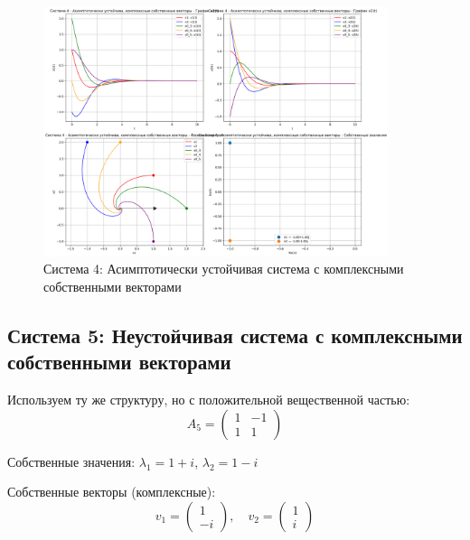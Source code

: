 \begin{figure}[h!]
\centering
\includegraphics[width=0.9\textwidth]{images/task1/система_4_-_асимптотически_устойчива,_комплексные_собственные_векторы.png}
\caption{Система 4: Асимптотически устойчивая система с комплексными собственными векторами}
\label{fig:system4}
\end{figure}

\subsection{Система 5: Неустойчивая система с комплексными собственными векторами}

Используем ту же структуру, но с положительной вещественной частью:
\begin{equation}
A_5 = \begin{pmatrix} 1 & -1 \\ 1 & 1 \end{pmatrix}
\end{equation}

Собственные значения: $\lambda_1 = 1 + i$, $\lambda_2 = 1 - i$

Собственные векторы (комплексные):
\begin{equation}
v_1 = \begin{pmatrix} 1 \\ -i \end{pmatrix}, \quad v_2 = \begin{pmatrix} 1 \\ i \end{pmatrix}
\end{equation}

